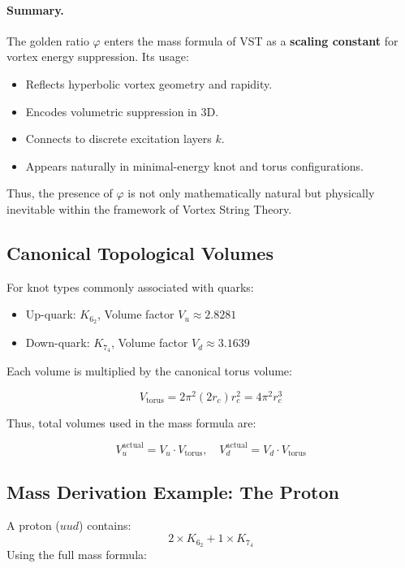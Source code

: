 \documentclass[11pt]{article}
\begin{document}
    \paragraph{Summary.}
    The golden ratio \( \varphi \) enters the mass formula of VST as a \textbf{scaling constant} for vortex energy suppression. Its usage:
    \begin{itemize}
        \item Reflects hyperbolic vortex geometry and rapidity.
        \item Encodes volumetric suppression in 3D.
        \item Connects to discrete excitation layers \( k \).
        \item Appears naturally in minimal-energy knot and torus configurations.
    \end{itemize}
    Thus, the presence of \( \varphi \) is not only mathematically natural but physically inevitable within the framework of Vortex String Theory.

    \subsection{Canonical Topological Volumes}

    For knot types commonly associated with quarks:

    \begin{itemize}
        \item Up-quark: \( K_{6_2} \), Volume factor \( V_u \approx 2.8281 \)
        \item Down-quark: \( K_{7_4} \), Volume factor \( V_d \approx 3.1639 \)
    \end{itemize}

    Each volume is multiplied by the canonical torus volume:

    \[
        V_{\text{torus}} = 2 \pi^2 (2r_c) r_c^2 = 4 \pi^2 r_c^3
    \]

    Thus, total volumes used in the mass formula are:

    \[
        V_u^{\text{actual}} = V_u \cdot V_{\text{torus}}, \quad
        V_d^{\text{actual}} = V_d \cdot V_{\text{torus}}
    \]

    \subsection{Mass Derivation Example: The Proton}

    A proton (\( uud \)) contains:
    \[
        2 \times K_{6_2} + 1 \times K_{7_4}
    \]
    Using the full mass formula:
\end{document}
